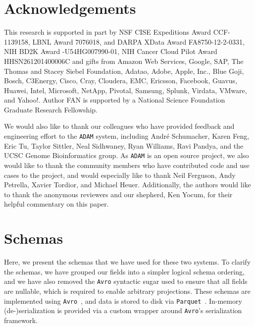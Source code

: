 \documentclass{sig-alternate}
\begin{document}
\section{Acknowledgements}

This research is supported in part by NSF CISE Expeditions Award CCF-1139158, LBNL Award 7076018, and DARPA XData Award FA8750-12-2-0331, NIH BD2K Award -U54HG007990-01, NIH Cancer Cloud Pilot Award \linebreak HHSN261201400006C and gifts from Amazon Web Services, Google, SAP,  The Thomas and Stacey Siebel Foundation, Adatao, Adobe, Apple, Inc., Blue Goji, Bosch, C3Energy, Cisco, Cray, Cloudera, EMC, Ericsson, Facebook, Guavus, Huawei, Intel, Microsoft, NetApp, Pivotal, Samsung, Splunk, Virdata, VMware, and Yahoo!. Author FAN is supported by a National Science Foundation Graduate Research Fellowship.

We would also like to thank our colleagues who have provided feedback and engineering effort to the \texttt{ADAM} system, including Andr\'{e} Schumacher, Karen Feng, Eric Tu, Taylor Sittler, Neal Sidhwaney, Ryan Williams, Ravi Pandya, and the UCSC Genome Bioinformatics group. As \texttt{ADAM} is an open source project, we also would like to thank the community members who have contributed code and use cases to the project, and would especially like to thank Neil Ferguson, Andy Petrella, Xavier Tordior, and Michael Heuer. Additionally, the authors would like to thank the anonymous reviewers and our shepherd, Ken Yocum, for their helpful commentary on this paper.

\balance

\clearpage

\appendix




\section{Schemas}
\label{sec:schema}

Here, we present the schemas that we have used for these two systems. To clarify the schemas, we
have grouped our fields into a simpler logical schema ordering, and we have also removed the \texttt{Avro} syntactic
sugar used to ensure that all fields are nullable, which is required to enable arbitrary
projections. These schemas are implemented using \texttt{Avro}~\cite{avro}, and data is stored to disk via
\texttt{Parquet}~\cite{parquet}. In-memory (de-)serialization is provided via a custom wrapper around \texttt{Avro}'s
serialization framework.
\end{document}
